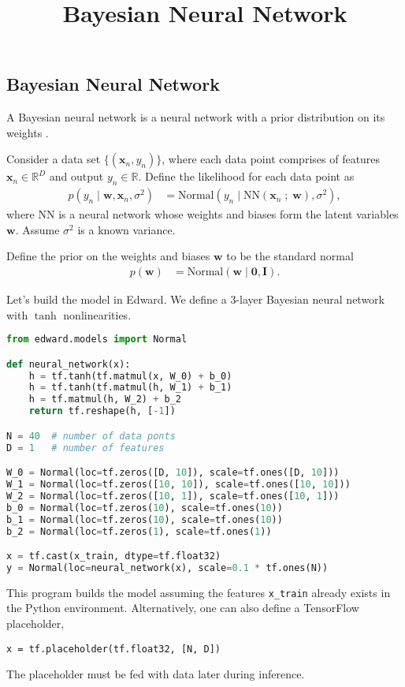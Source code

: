 \title{Bayesian Neural Network}

\subsection{Bayesian Neural Network}

A Bayesian neural network is a neural network with a prior
distribution on its weights \citep{neal2012bayesian}.

Consider a data set $\{(\mathbf{x}_n, y_n)\}$, where each data point
comprises of features $\mathbf{x}_n\in\mathbb{R}^D$ and output
$y_n\in\mathbb{R}$. Define the likelihood for each data point as
\begin{align*}
  p(y_n \mid \mathbf{w}, \mathbf{x}_n, \sigma^2)
  &=
  \text{Normal}(y_n \mid \mathrm{NN}(\mathbf{x}_n\;;\;\mathbf{w}), \sigma^2),
\end{align*}
where $\mathrm{NN}$ is a neural network whose weights and biases form
the latent variables $\mathbf{w}$. Assume $\sigma^2$ is a
known variance.

Define the prior on the weights and biases $\mathbf{w}$ to be the standard normal
\begin{align*}
  p(\mathbf{w})
  &=
  \text{Normal}(\mathbf{w} \mid \mathbf{0}, \mathbf{I}).
\end{align*}

Let's build the model in Edward. We define a 3-layer Bayesian neural
network with $\tanh$ nonlinearities.
\begin{lstlisting}[language=Python]
from edward.models import Normal

def neural_network(x):
    h = tf.tanh(tf.matmul(x, W_0) + b_0)
    h = tf.tanh(tf.matmul(h, W_1) + b_1)
    h = tf.matmul(h, W_2) + b_2
    return tf.reshape(h, [-1])

N = 40  # number of data ponts
D = 1   # number of features

W_0 = Normal(loc=tf.zeros([D, 10]), scale=tf.ones([D, 10]))
W_1 = Normal(loc=tf.zeros([10, 10]), scale=tf.ones([10, 10]))
W_2 = Normal(loc=tf.zeros([10, 1]), scale=tf.ones([10, 1]))
b_0 = Normal(loc=tf.zeros(10), scale=tf.ones(10))
b_1 = Normal(loc=tf.zeros(10), scale=tf.ones(10))
b_2 = Normal(loc=tf.zeros(1), scale=tf.ones(1))

x = tf.cast(x_train, dtype=tf.float32)
y = Normal(loc=neural_network(x), scale=0.1 * tf.ones(N))
\end{lstlisting}
This program builds the model assuming the features \texttt{x\_train}
already exists in the Python environment. Alternatively, one can also
define a TensorFlow placeholder,
\begin{lstlisting}
x = tf.placeholder(tf.float32, [N, D])
\end{lstlisting}
The placeholder must be fed with data later during inference.

